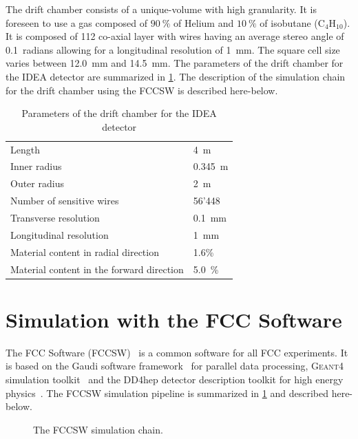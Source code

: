 \documentclass{cernatsnote}
\begin{document}
The drift chamber consists of a unique-volume with high granularity. It is foreseen to use a gas composed of $90~\%$ of Helium and $10~\%$ of isobutane ($\text{C}_{4}\text{H}_{10}$). It is composed of 112 co-axial layer with wires having an average stereo angle of 0.1~radians allowing for a longitudinal resolution of 1~mm. The square cell size varies between 12.0~mm and 14.5~mm. The parameters of the drift chamber for the IDEA detector are summarized in \cref{driftChamberParams}. The description of the simulation chain for the drift chamber using the FCCSW is described here-below.

\begin{table}[!t]
	\renewcommand{\arraystretch}{1.3}
	\caption{Parameters of the drift chamber for the IDEA detector}
	\label{driftChamberParams}
	\centering
	\begin{tabular}{l l}
		\toprule
			Length & 4~m \\
      Inner radius & 0.345~m \\
      Outer radius & 2~m\\
      Number of sensitive wires & 56'448 \\
      Transverse resolution & 0.1~mm \\
			Longitudinal resolution & 1~mm \\
			Material content in radial direction & 1.6\% \\
			Material content in the forward direction & 5.0~\% \\
		\bottomrule
	\end{tabular}
\end{table}


\section{Simulation with the FCC Software}

The FCC Software (FCCSW)~\cite{FCCSW} is a common software for all FCC experiments. It is based on the Gaudi software framework~\cite{Gaudi} for parallel data processing, \textsc{Geant4} simulation toolkit~\cite{Geant4} and the DD4hep detector description toolkit for high energy physics~\cite{DD4hep}. The FCCSW simulation pipeline is summarized in \cref{simu_chain} and described here-below.

\begin{figure}[!h]
\centering
\caption{The FCCSW simulation chain.}
\label{simu_chain}
\end{figure}
\end{document}
